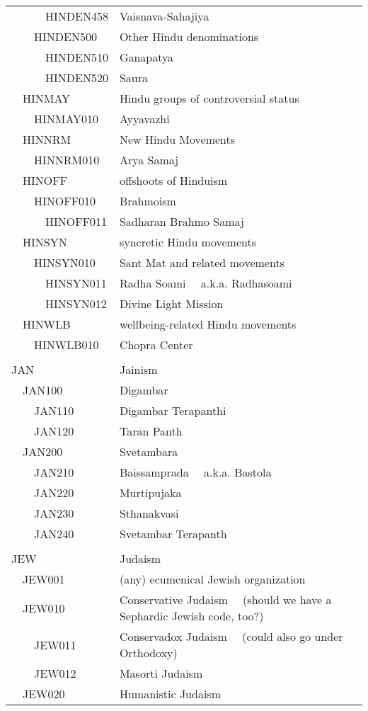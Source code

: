 \documentclass[12pt]{article}
\begin{document}
\begin{tiny}
\begin{center}
\begin{longtable}{|l|l|}
~~~~~~HINDEN458 & Vaisnava-Sahajiya \\
~~~~HINDEN500 & Other Hindu denominations \\
~~~~~~HINDEN510 & Ganapatya \\
~~~~~~HINDEN520 & Saura \\
~~HINMAY & Hindu groups of controversial status \\
~~~~HINMAY010 & Ayyavazhi \\
~~HINNRM & New Hindu Movements \\
~~~~HINNRM010 & Arya Samaj \\
~~HINOFF & offshoots of Hinduism \\
~~~~HINOFF010 & Brahmoism \\
~~~~~~HINOFF011 & Sadharan Brahmo Samaj \\
~~HINSYN & syncretic Hindu movements \\
~~~~HINSYN010 & Sant Mat and related movements \\
~~~~~~HINSYN011 & Radha Soami	~~a.k.a. Radhasoami \\
~~~~~~HINSYN012 & Divine Light Mission \\
~~HINWLB & wellbeing-related Hindu movements \\
~~~~HINWLB010 & Chopra Center \\
 \\
{\normalsize JAN } & {\normalsize Jainism } \\
~~JAN100 & Digambar \\
~~~~JAN110 & Digambar Terapanthi \\
~~~~JAN120 & Taran Panth \\
~~JAN200 & Svetambara \\
~~~~JAN210 & Baissamprada	~~a.k.a. Bastola \\
~~~~JAN220 & Murtipujaka \\
~~~~JAN230 & Sthanakvasi \\
~~~~JAN240 & Svetambar Terapanth \\
 \\
{\normalsize JEW } & {\normalsize Judaism } \\
~~JEW001 & (any) ecumenical Jewish organization \\
~~JEW010 & Conservative Judaism	~~(should we have a Sephardic Jewish code, too?) \\
~~~~JEW011 & Conservadox Judaism	~~(could also go under Orthodoxy) \\
~~~~JEW012 & Masorti Judaism \\
~~JEW020 & Humanistic Judaism \\

\end{longtable}
\end{center}
\end{tiny}
\end{document}
